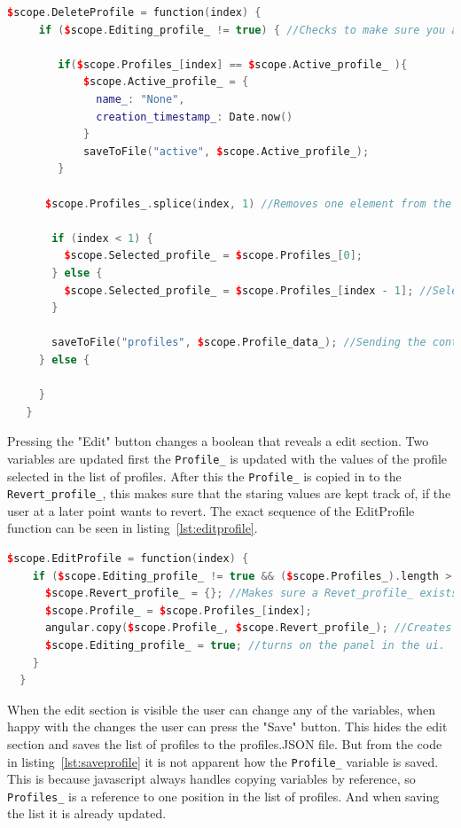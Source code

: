\begin{lstlisting}[caption = {DeleteProfile function in editParam.js}, captionpos=b, label={lst:deleteprofile}, language=C++,firstnumber=1]
 $scope.DeleteProfile = function(index) {
     if ($scope.Editing_profile_ != true) { //Checks to make sure you are not deleting the profile that's currently being edited
 
 		if($scope.Profiles_[index] == $scope.Active_profile_ ){
 			$scope.Active_profile_ = {
 		      name_: "None",
 		      creation_timestamp_: Date.now()
 		    }
 			saveToFile("active", $scope.Active_profile_);
 		}
 
 	  $scope.Profiles_.splice(index, 1) //Removes one element from the list at index
 
       if (index < 1) {
         $scope.Selected_profile_ = $scope.Profiles_[0];
       } else {
         $scope.Selected_profile_ = $scope.Profiles_[index - 1]; //Selects the profile under the one deleted.
       }
 
       saveToFile("profiles", $scope.Profile_data_); //Sending the content to the server to get saved.
     } else {
 
     }
   }
\end{lstlisting}

Pressing the "Edit" button changes a boolean that reveals a edit section. Two variables are updated first the \texttt{Profile\_} is updated with the values of the profile selected in the list of profiles. After this the \texttt{Profile_} is copied in to the \texttt{Revert\_profile\_}, this makes sure that the staring values are kept track of, if the user at a later point wants to revert. The exact sequence of the EditProfile function can be seen in listing~\ref{lst:editprofile}.

\begin{lstlisting}[caption = {EditProfile function in editParam.js}, captionpos=b, label={lst:editprofile}, language=C++,firstnumber=1]
$scope.EditProfile = function(index) {
    if ($scope.Editing_profile_ != true && ($scope.Profiles_).length > 0) { //Makes sure that there is something to edit!
      $scope.Revert_profile_ = {}; //Makes sure a Revet_profile_ exists
      $scope.Profile_ = $scope.Profiles_[index];
      angular.copy($scope.Profile_, $scope.Revert_profile_); //Creates a copy of Profile_ into Revert_profile_ instead of reference
      $scope.Editing_profile_ = true; //turns on the panel in the ui.
    }
  }
\end{lstlisting}

When the edit section is visible the user can change any of the variables, when happy with the changes the user can press the "Save" button. This hides the edit section and saves the list of profiles to the profiles.JSON file. But from the code in listing~\ref{lst:saveprofile} it is not apparent how the \texttt{Profile\_} variable is saved. This is because javascript always handles copying variables by reference, so \texttt{Profiles\_} is a reference to one position in the list of profiles. And when saving the list it is already updated.

